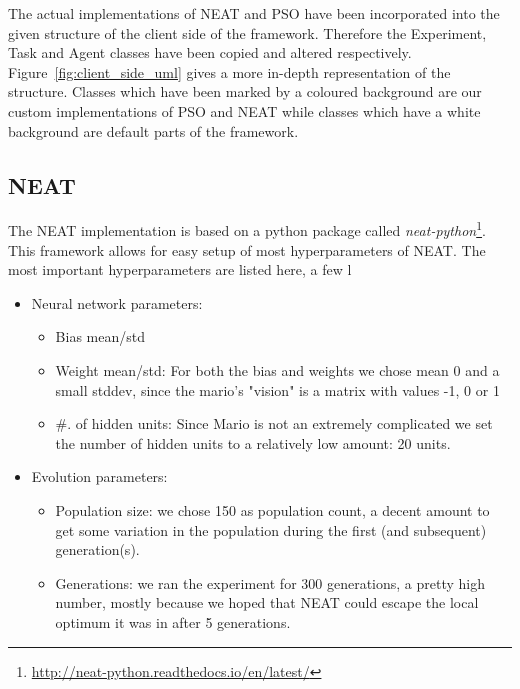 \documentclass[]{article}
\begin{document}
The actual implementations of NEAT and PSO have been incorporated into the given structure of the client side of the framework. Therefore the Experiment, Task and Agent classes have been copied and altered respectively. Figure~\ref{fig:client_side_uml} gives a more in-depth representation of the structure. Classes which have been marked by a coloured background are our custom implementations of PSO and NEAT while classes which have a white background are default parts of the framework. 



\subsection{NEAT}
The NEAT implementation is based on a python package called \emph{neat-python}\footnote{\url{http://neat-python.readthedocs.io/en/latest/}}. This framework allows for easy setup of most hyperparameters of NEAT. The most important hyperparameters are listed here, a few l
\begin{itemize}
    \item Neural network parameters:
    \begin{itemize}
        \item Bias mean/std 
        \item Weight mean/std: For both the bias and weights we chose mean 0 and a small stddev, since the mario's "vision" is a matrix with values -1, 0 or 1
        \item \#. of hidden units: Since Mario is not an extremely complicated we set the number of hidden units to a relatively low amount: 20 units.
    \end{itemize}
    \item Evolution parameters:
    \begin{itemize}
        \item Population size: we chose 150 as population count, a decent amount to get some variation in the population during the first (and subsequent) generation(s).
        \item Generations: we ran the experiment for 300 generations, a pretty high number, mostly because we hoped that NEAT could escape the local optimum it was in after 5 generations.
    \end{itemize}
\end{itemize}
\end{document}
